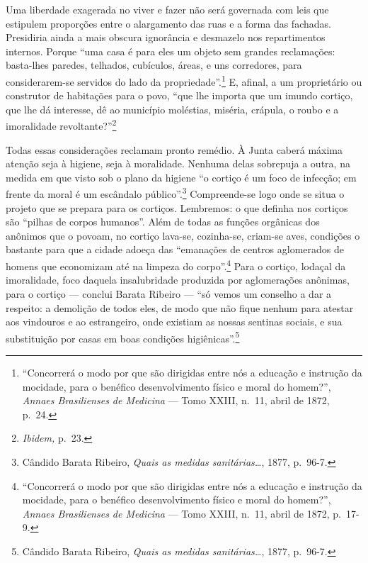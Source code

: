Uma liberdade exagerada no viver e fazer não será governada com leis que
estipulem proporções entre o alargamento das ruas e a forma das
fachadas. Presidiria ainda a mais obscura ignorância e desmazelo nos
repartimentos internos. Porque ``uma casa é para eles um objeto sem
grandes reclamações: basta-lhes paredes, telhados, cubículos, áreas, e
uns corredores, para considerarem-se servidos do lado da
propriedade''.\footnote{``Concorrerá o modo por que são dirigidas entre
  nós a educação e instrução da mocidade, para o benéfico
  desenvolvimento físico e moral do homem?'', \textit{Annaes Brasilienses
  de Medicina} --- Tomo XXIII, n.~11, abril de 1872, p.~24.} E, afinal, a
um proprietário ou construtor de habitações para o povo, ``que lhe
importa que um imundo cortiço, que lhe dá interesse, dê ao município
moléstias, miséria, crápula, o roubo e a imoralidade
revoltante?''\footnote{\textit{Ibidem,} p.~23.}

Todas essas considerações reclamam pronto remédio. À Junta caberá máxima
atenção seja à higiene, seja à moralidade. Nenhuma delas sobrepuja a
outra, na medida em que visto sob o plano da higiene ``o cortiço é um
foco de infecção; em frente da moral é um escândalo público''.\footnote{Cândido
  Barata Ribeiro, \textit{Quais as medidas sanitárias\ldots{}}, 1877,
  p.~96-7.} Compreende-se logo onde se situa o projeto que se prepara
para os cortiços. Lembremos: o que definha nos cortiços são ``pilhas de
corpos humanos''. Além de todas as funções orgânicas dos anônimos que o
povoam, no cortiço lava-se, cozinha-se, criam-se aves, condições o
bastante para que a cidade adoeça das ``emanações de centros aglomerados
de homens que economizam até na limpeza do corpo''.\footnote{``Concorrerá
  o modo por que são dirigidas entre nós a educação e instrução da
  mocidade, para o benéfico desenvolvimento físico e moral do homem?'',
  \textit{Annaes Brasilienses de Medicina} --- Tomo XXIII, n.~11, abril de
  1872, p.~17-9.} Para o cortiço, lodaçal da imoralidade, foco daquela
insalubridade produzida por aglomerações anônimas, para o cortiço ---
conclui Barata Ribeiro --- ``só vemos um conselho a dar a respeito: a
demolição de todos eles, de modo que não fique nenhum para atestar aos
vindouros e ao estrangeiro, onde existiam as nossas sentinas sociais, e
sua substituição por casas em boas condições higiênicas''.\footnote{Cândido
  Barata Ribeiro, \textit{Quais as medidas sanitárias\ldots{}}, 1877,
  p.~96-7.}

